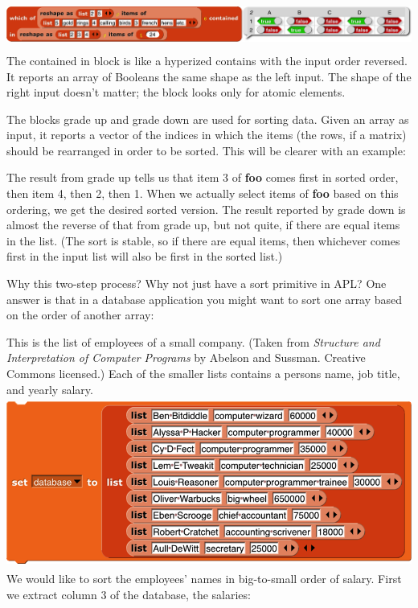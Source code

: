 \includegraphics[width=7.48542in,height=0.65972in]{media/image1293.png}The
contained in block is like a hyperized contains with the input order
reversed. It reports an array of Booleans the same shape as the left
input. The shape of the right input doesn't matter; the block looks only
for atomic elements.

The blocks grade up and grade down are used for sorting data. Given an
array as input, it reports a vector of the indices in which the items
(the rows, if a matrix) should be rearranged in order to be sorted. This
will be clearer with an example:

The result from grade up tells us that item 3 of \textbf{foo} comes
first in sorted order, then item 4, then 2, then 1. When we actually
select items of \textbf{foo} based on this ordering, we get the desired
sorted version. The result reported by grade down is almost the reverse
of that from grade up, but not quite, if there are equal items in the
list. (The sort is stable, so if there are equal items, then whichever
comes first in the input list will also be first in the sorted list.)

Why this two-step process? Why not just have a sort primitive in APL?
One answer is that in a database application you might want to sort one
array based on the order of another array:

This is the list of employees of a small company. (Taken from
\emph{Structure and Interpretation of Computer Programs} by Abelson and
Sussman. Creative Commons licensed.) Each of the smaller lists contains
a person\textquotesingle s name, job title, and yearly salary.
\includegraphics[width=5.48333in,height=2.2in]{media/image1304.png}We
would like to sort the employees' names in big-to-small order of salary.
First we extract column 3 of the database, the salaries:

